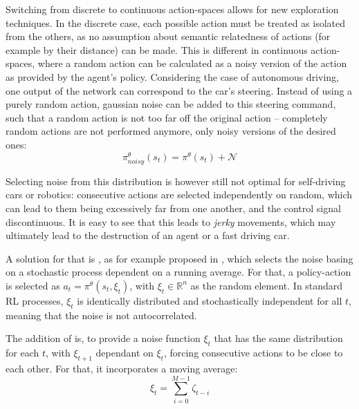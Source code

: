 \label{sec:contexptheory}

Switching from discrete to continuous action-spaces allows for new exploration techniques. In the discrete case, each possible action must be treated as isolated from the others, as no assumption about semantic relatedness of actions (for example by their distance) can be made. 
This is different in continuous action-spaces, where a random action can be calculated as a noisy version of the action as provided by the agent's policy. Considering the case of autonomous driving, one output of the network can correspond to the car's steering. Instead of using a purely random action, gaussian noise can be added to this steering command, such that a random action is not too far off the original action -- completely random actions are not performed anymore, only noisy versions of the desired ones:
\begin{equation*}
	\pi^\theta_{noisy}(s_t) = \pi^\theta(s_t) + \mathcal{N}
\end{equation*}

Selecting noise from this distribution is however still not optimal for self-driving cars or robotics: consecutive actions are selected independently on random, which can lead to them being excessively far from one another, and the control signal discontinuous. It is easy to see that this leads to \textit{jerky} movements, which may ultimately lead to the destruction of an agent or a fast driving car. 

A solution for that is , as for example proposed in \cite{wawrzynski_control_2015}, which selects the noise basing on a stochastic process dependent on a running average. For that, a policy-action is selected as $a_t = \pi^\theta(s_t, \xi_t)$, with $\xi_t \in \mathds{R}^n$ as the random element. In standard RL processes, $\xi_t$ is identically distributed and stochastically independent for all $t$, meaning that the noise is not autocorrelated.

The addition of \cite{wawrzynski_control_2015} is, to provide a noise function $\xi_t$ that has the same distribution for each $t$, with $\xi_{t+1}$ dependant on $\xi_t$, forcing consecutive actions to be close to each other. For that, it incorporates a moving average:\\
\begin{equation*}
	\xi_t = \sum^{M-1}_{i=0} \zeta_{t-i}
\end{equation*}

